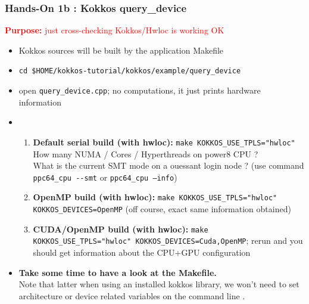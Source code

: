 \begin{frame}[fragile=singleslide]
  \frametitle{Hands-On 1b : Kokkos query\_device}

  {\large\textcolor{red}{\textbf{Purpose:} just cross-checking Kokkos/Hwloc is working OK}}

  \begin{itemize}
  \item Kokkos sources will be built by the application Makefile
  \item \texttt{cd \$HOME/kokkos-tutorial/kokkos/example/query\_device}
  \item open \texttt{query\_device.cpp}; no computations, it just prints hardware information
  \item 
    \begin{enumerate}
    \item \textbf{Default serial build (with hwloc):} \texttt{make KOKKOS\_USE\_TPLS="hwloc"}\\
      How many NUMA / Cores / Hyperthreads on power8 CPU ?\\
      What is the current SMT mode on a ouessant login node ? (use command \texttt{ppc64\_cpu \--\--smt} or \texttt{ppc64\_cpu --info})
    \item \textbf{OpenMP build (with hwloc):} \texttt{make KOKKOS\_USE\_TPLS="hwloc" KOKKOS\_DEVICES=OpenMP} (off course, exact same information obtained)
    \item \textbf{CUDA/OpenMP build (with hwloc):} \texttt{make KOKKOS\_USE\_TPLS="hwloc" KOKKOS\_DEVICES=Cuda,OpenMP}; rerun and you should get information about the CPU+GPU configuration
    \end{enumerate}
  \item \textbf{Take some time to have a look at the Makefile.}\\
    Note that latter when using an installed kokkos library, we won't need to set architecture or device related variables on the command line .
  \end{itemize}

\end{frame}

